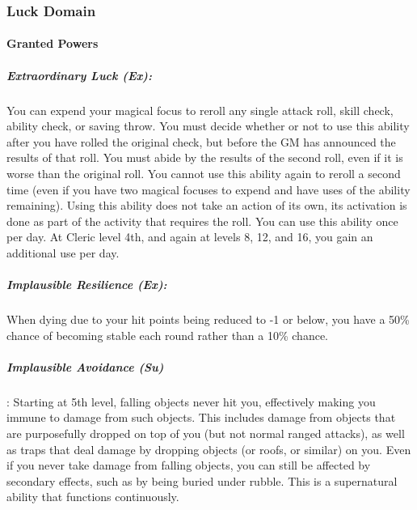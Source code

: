 \subsubsection{Luck Domain}
\paragraph{Granted Powers}
\subparagraph{Extraordinary Luck (Ex):}
You can expend your magical focus to reroll any single attack roll, skill check, ability check, or saving throw.
You must decide whether or not to use this ability after you have rolled the original check, but before the GM has announced the results of that roll.
You must abide by the results of the second roll, even if it is worse than the original roll.
You cannot use this ability again to reroll a second time (even if you have two magical focuses to expend and have uses of the ability remaining).
Using this ability does not take an action of its own, its activation is done as part of the activity that requires the roll.
You can use this ability once per day. At Cleric level 4th, and again at levels 8, 12, and 16, you gain an additional use per day.
\subparagraph{Implausible Resilience (Ex):} 
When dying due to your hit points being reduced to -1 or below, you have a 50\% chance of becoming stable each round rather than a 10\% chance.
\subparagraph{Implausible Avoidance (Su)}: 
Starting at 5th level, falling objects never hit you, effectively making you immune to damage from such objects. This includes damage from objects that are purposefully dropped on top of you (but not normal ranged attacks), as well as traps that deal damage by dropping objects (or roofs, or similar) on you. Even if you never take damage from falling objects, you can still be affected by secondary effects, such as by being buried under rubble. This is a supernatural ability that functions continuously.
